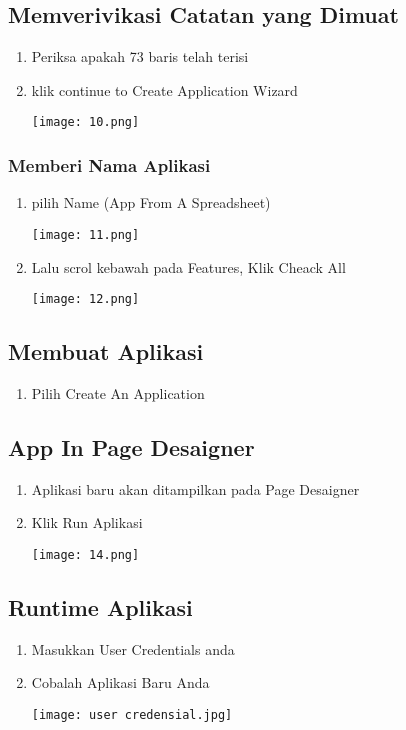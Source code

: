 \documentclass[a4paper,12pt]{report}
\begin{document}
\subsection{Memverivikasi Catatan yang Dimuat}
\begin{enumerate}
    \item Periksa apakah 73 baris telah terisi
    \item klik continue to Create Application Wizard
    \begin{center}
    \texttt{[image: 10.png]}
    \end{center}
\end{enumerate}
\subsubsection{Memberi Nama Aplikasi}
\begin{enumerate}
    \item pilih Name (App From A Spreadsheet)
    \begin{center}
    \texttt{[image: 11.png]}
    \end{center}
    \item Lalu scrol kebawah pada Features, Klik Cheack All
    \begin{center}
    \texttt{[image: 12.png]}
    \end{center}
\end{enumerate}
\subsection{Membuat Aplikasi}
\begin{enumerate}
    \item Pilih Create An Application
\end{enumerate}
\subsection{App In Page Desaigner}
\begin{enumerate}
    \item Aplikasi baru akan ditampilkan pada Page Desaigner
    \item Klik Run Aplikasi
    \begin{center}
    \texttt{[image: 14.png]}
    \end{center}
\end{enumerate}
\subsection{Runtime Aplikasi}
\begin{enumerate}
    \item Masukkan User Credentials anda
    \item Cobalah Aplikasi Baru Anda
    \begin{center}
    \texttt{[image: user credensial.jpg]}
    \end{center}
\end{enumerate}
\end{document}
